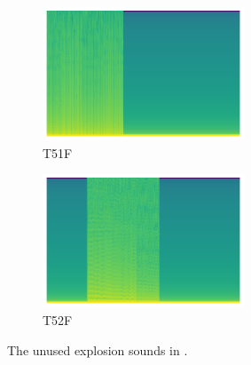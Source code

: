 \begin{figure}[H]
{
    \begin{subfigure}{0.43\textwidth}
      \includegraphics[width=6cm]{tempest_sounds/buttons/UNUSE1.raw-button.png}%
      \caption*{T51F}
    \end{subfigure}
    \hspace{0.4cm}
    \begin{subfigure}{0.53\textwidth}
      \includegraphics[width=6cm]{tempest_sounds/buttons/UNUSE2.raw-button.png}%
      \caption*{T52F}
    \end{subfigure}
  }\caption*{The unused explosion sounds in .}
\end{figure}
